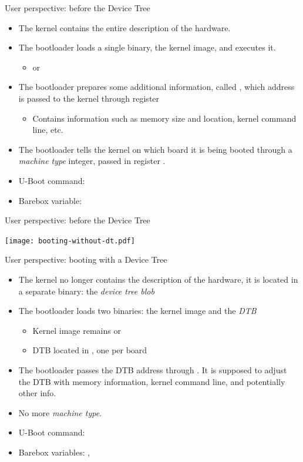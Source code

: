 \documentclass[obeyspaces,spaces,hyphens]{beamer}
\begin{document}
\begin{frame}{User perspective: before the Device Tree}
  \begin{itemize}
  \item The kernel contains the entire description of the hardware.
  \item The bootloader loads a single binary, the kernel image, and
    executes it.
    \begin{itemize}
    \item {} or 
    \end{itemize}
  \item The bootloader prepares some additional information, called
    , which address is passed to the kernel through
    register 
    \begin{itemize}
    \item Contains information such as memory size and location,
      kernel command line, etc.
    \end{itemize}
  \item The bootloader tells the kernel on which board it is being
    booted through a {\em machine type} integer, passed in register
    .
  \item U-Boot command: 
  \item Barebox variable: 
  \end{itemize}
\end{frame}

\begin{frame}{User perspective: before the Device Tree}
  \begin{center}
    \texttt{[image: booting-without-dt.pdf]}
  \end{center}
\end{frame}

\begin{frame}{User perspective: booting with a Device Tree}
  \begin{itemize}
  \item The kernel no longer contains the description of the hardware,
    it is located in a separate binary: the {\em device tree blob}
  \item The bootloader loads two binaries: the kernel image and the
    {\em DTB}
    \begin{itemize}
    \item Kernel image remains  or 
    \item DTB located in , one per board
    \end{itemize}
  \item The bootloader passes the DTB address through . It is
    supposed to adjust the DTB with memory information, kernel command
    line, and potentially other info.
  \item No more {\em machine type}.
  \item U-Boot command: 
  \item Barebox variables: , 
  \end{itemize}
\end{frame}
\end{document}
